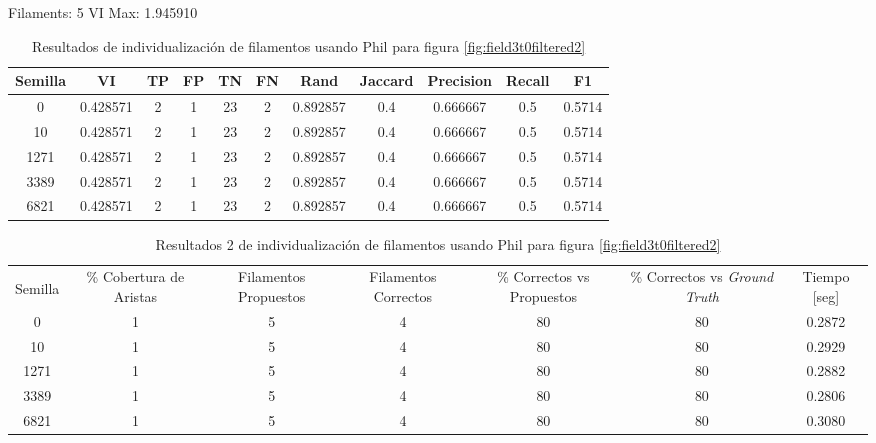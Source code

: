 Filaments: 5	VI Max: 1.945910
\begin{table}[h]
    \centering
    \begin{tabular}{|c|c|c|c|c|c|c|c|c|c|c|}
    \hline
        Semilla & VI & TP & FP &TN &FN & Rand	& Jaccard &	Precision &	Recall &	F1 \\ \hline 
        0    & 0.428571 & 2 & 1 & 23 & 2 & 0.892857 & 0.4 & 0.666667 & 0.5 & 0.5714 \\
        10   & 0.428571 & 2 & 1 & 23 & 2 & 0.892857 & 0.4 & 0.666667 & 0.5 & 0.5714 \\
        1271 & 0.428571 & 2 & 1 & 23 & 2 & 0.892857 & 0.4 & 0.666667 & 0.5 & 0.5714 \\
        3389 & 0.428571 & 2 & 1 & 23 & 2 & 0.892857 & 0.4 & 0.666667 & 0.5 & 0.5714 \\
        6821 & 0.428571 & 2 & 1 & 23 & 2 & 0.892857 & 0.4 & 0.666667 & 0.5 & 0.5714 \\
        \hline
    \end{tabular}
    \caption{Resultados de individualizaci\'on de filamentos usando Phil para figura \ref{fig:field3t0filtered2}}
    \label{tab:field3t0filtered2DetailedResults1}
\end{table}


\begin{table}[h]
    \centering
    \begin{tabular}{|c|c|c|c|c|c|c|}
    \hline
         & \multirow{4}{2cm}{\centering \% Cobertura de Aristas} & \multirow{4}{2cm}{Filamentos Propuestos} & \multirow{4}{2cm}{Filamentos Correctos} & \multirow{4}{2.5cm}{\% Correctos vs Propuestos} & \multirow{4}{2.5cm}{\centering \% Correctos vs {\it Ground Truth}} & \multirow{4}{1.2cm}{\centering Tiempo [seg]} \\
         &  &  &  & & &  \\
        Semilla &  &  &  & & &  \\
        &  &  &  & & &  \\ \hline 
        0 & 1 & 5 & 4 & 80 & 80 & 0.2872 \\
        10 & 1 & 5 & 4 & 80 & 80 & 0.2929\\
        1271 & 1 & 5 & 4 & 80 & 80 & 0.2882\\
        3389 & 1 & 5 & 4 & 80 & 80 & 0.2806\\
        6821 & 1 & 5 & 4 & 80 & 80 & 0.3080\\
        \hline
    \end{tabular}
    \caption{Resultados 2 de individualizaci\'on de filamentos usando Phil para figura \ref{fig:field3t0filtered2}}
    \label{tab:field3t0filtered2DetailedResults2}
\end{table}